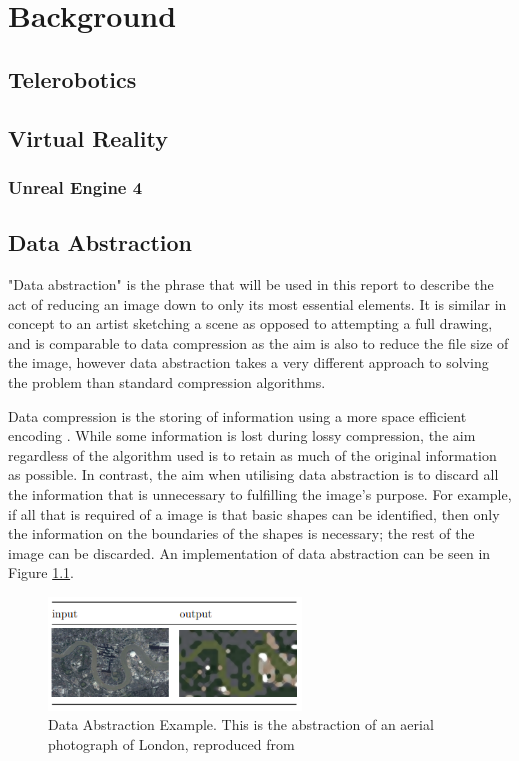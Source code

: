 \chapter{Background}
\section{Telerobotics}
\section{Virtual Reality}
\subsection{Unreal Engine 4}
\section{Data Abstraction}

"Data abstraction" is the phrase that will be used in this report to describe the act of reducing an image down to only its most essential elements. It is similar in concept to an artist sketching a scene as opposed to attempting a full drawing, and is comparable to data compression as the aim is also to reduce the file size of the image, however data abstraction takes a very different approach to solving the problem than standard compression algorithms.

Data compression is the storing of information using a more space efficient encoding \cite{compression}. While some information is lost during lossy compression, the aim regardless of the algorithm used is to retain as much of the original information as possible. In contrast, the aim when utilising data abstraction is to discard all the information that is unnecessary to fulfilling the image's purpose. For example, if all that is required of a image is that basic shapes can be identified, then only the information on the boundaries of the shapes is necessary; the rest of the image can be discarded. An implementation of data abstraction can be seen in Figure \ref{fig:abstraction3rdyear}.


\begin{figure}[H]
    \begin{center}
      \includegraphics[width=0.6\textwidth]{Figures/abstraction3rdyear.png}
      \caption[Data Abstraction Example]{Data Abstraction Example. This is the abstraction of an aerial photograph of London, reproduced from \cite{abstraction3rdyear}}
      \label{fig:abstraction3rdyear}
    \end{center}
\end{figure}

